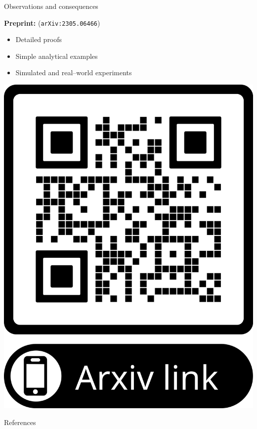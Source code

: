 \begin{frame}{Observations and consequences}
\begin{minipage}{0.85\textwidth}
\textbf{Preprint: }\citet{giordano:2023:bayesij}  (\texttt{arXiv:2305.06466})
%
\begin{itemize}
\item Detailed proofs
\item Simple analytical examples
\item Simulated and real--world experiments
\end{itemize}
%
\end{minipage}
\begin{minipage}{0.1\textwidth}
    \includegraphics[width=1.0\textwidth]{qr_code_arxiv.png}
\end{minipage}
    
\end{frame}




\begin{frame}{References}

\footnotesize


\begingroup
\renewcommand{\section}[2]{}%

\endgroup

%
\end{frame}
